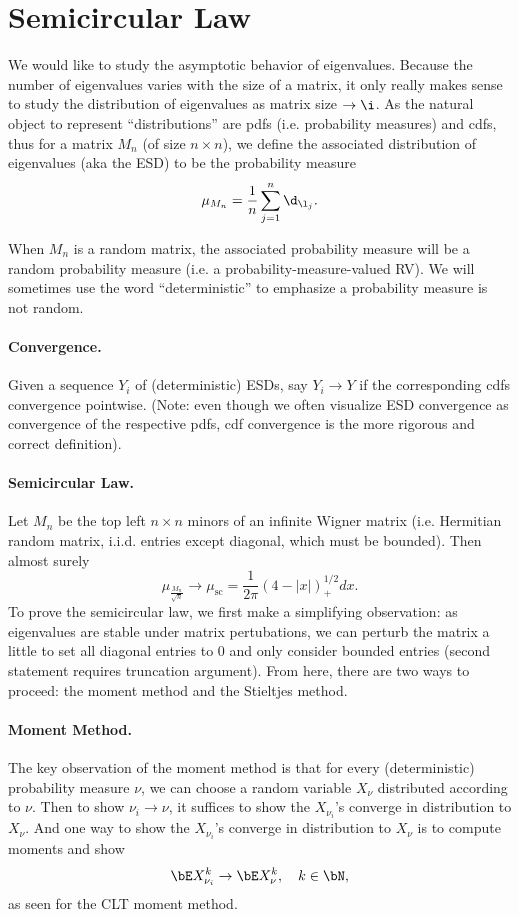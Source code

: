 \section*{Semicircular Law}

We would like to study the asymptotic behavior of eigenvalues. Because the number of eigenvalues varies with the size of a matrix, it only really makes sense to study the distribution of eigenvalues as matrix size $\to \i$. As the natural object to represent ``distributions'' are pdfs (i.e. probability measures) and cdfs, thus for a matrix $M_n$ (of size $n \times n$), we define the associated distribution of eigenvalues (aka the ESD) to be the probability measure
\[
    \mu_{M_n} = \frac{1}{n} \sum_{j = 1}^n \d_{\l_j}.
\]

When $M_n$ is a random matrix, the associated probability measure will be a random probability measure (i.e. a probability-measure-valued RV). We will sometimes use the word ``deterministic'' to emphasize a probability measure is not random.

\paragraph{Convergence.} Given a sequence $Y_i$ of (deterministic) ESDs, say $Y_i \to Y$ if the corresponding cdfs convergence pointwise. (Note: even though we often visualize ESD convergence as convergence of the respective pdfs, cdf convergence is the more rigorous and correct definition).

\paragraph{Semicircular Law.} Let $M_n$ be the top left $n \times n$ minors of an infinite Wigner matrix (i.e. Hermitian random matrix, i.i.d. entries except diagonal, which must be bounded). Then almost surely
\[
    \mu_{\frac{M_n}{\sqrt{n}}} \to \mu_{\text{sc}} = \frac{1}{2\pi}(4 - |x|)_+^{1/2}dx.
\]
To prove the semicircular law, we first make a simplifying observation: as eigenvalues are stable under matrix pertubations, we can perturb the matrix a little to set all diagonal entries to 0 and only consider bounded entries (second statement requires truncation argument). From here, there are two ways to proceed: the moment method and the Stieltjes method.

\paragraph{Moment Method.} The key observation of the moment method is that for every (deterministic) probability measure $\nu$, we can choose a random variable $X_{\nu}$ distributed according to $\nu$. Then to show $\nu_i \to \nu$, it suffices to show the $X_{\nu_i}$'s converge in distribution to $X_{\nu}$. And one way to show the $X_{\nu_i}$'s converge in distribution to $X_{\nu}$ is to compute moments and show
\[
    \bE X_{\nu_i}^k \to \bE X_{\nu}^k, \quad k \in \bN,
\]
as seen for the CLT moment method.

